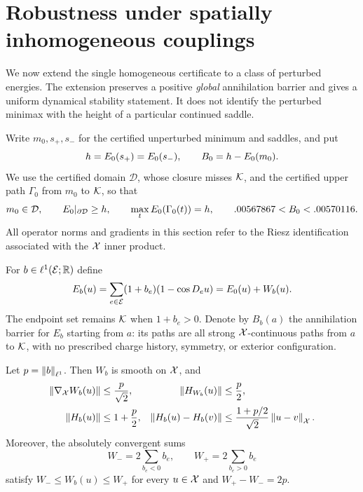 \section{Robustness under spatially inhomogeneous couplings}
\label{sec:robustness}

We now extend the single homogeneous certificate to a class of perturbed
energies. The extension preserves a positive \emph{global} annihilation
barrier and gives a uniform dynamical stability statement. It does not
identify the perturbed minimax with the height of a particular continued
saddle.

Write $m_0,s_+,s_-$ for the certified unperturbed minimum and saddles,
and put
\[
 h=E_0(s_+)=E_0(s_-),\qquad B_0=h-E_0(m_0).
\]
We use the certified domain $\mathcal D$, whose closure misses $\mathcal K$, and the
certified upper path $\Gamma_0$ from $m_0$ to $\mathcal K$, so that
\begin{equation}
 \label{eq:robust-seed-global}
 m_0\in\mathcal D,\qquad E_0|_{\partial\mathcal D}\ge h,
 \qquad \max_tE_0(\Gamma_0(t))=h,
 \qquad .00567867<B_0<.00570116.
\end{equation}
All operator norms and gradients in this section refer to the Riesz
identification associated with the $\mathcal X$ inner product.

For $b\in\ell^1(\mathcal E;\mathbb R)$ define
\begin{equation}
 \label{eq:coupling-energy}
 E_b(u)=\sum_{e\in\mathcal E}(1+b_e)(1-\cos D_eu)
       =E_0(u)+W_b(u).
\end{equation}
The endpoint set remains $\mathcal K$ when $1+b_e>0$. Denote by $B_b(a)$ the
annihilation barrier for $E_b$ starting from $a$: its paths are all strong
$\mathcal X$-continuous paths from $a$ to $\mathcal K$, with no prescribed charge history,
symmetry, or exterior configuration.

\begin{lemma}
\label{lem:coupling-bounds}
Let $p=\left\lVert b\right\rVert_{\ell^1}$. Then $W_b$ is smooth on $\mathcal X$, and
\begin{align}
 \left\lVert\nabla_{\mathcal X}W_b(u)\right\rVert&\le\frac{p}{\sqrt2},&
 \left\lVert H_{W_b}(u)\right\rVert&\le\frac p2,\label{eq:coupling-derivatives}\\
 \left\lVert H_b(u)\right\rVert&\le1+\frac p2,&
 \left\lVert H_b(u)-H_b(v)\right\rVert&\le
       \frac{1+p/2}{\sqrt2}\left\lVert u-v\right\rVert_{\mathcal X}.
 \label{eq:coupling-hessian}
\end{align}
Moreover, the absolutely convergent sums
\begin{equation}
 \label{eq:coupling-oscillation}
 W_-=2\sum_{b_e<0}b_e,\qquad W_+=2\sum_{b_e>0}b_e
\end{equation}
satisfy $W_-\le W_b(u)\le W_+$ for every $u\in\mathcal X$ and
$W_+-W_-=2p$.
\end{lemma}

